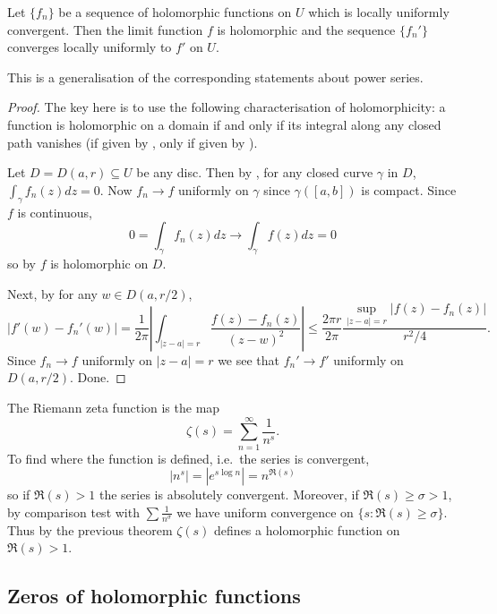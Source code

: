 \documentclass[a4paper]{article}
\begin{document}
\begin{theorem}
  Let \(\{f_n\}\) be a sequence of holomorphic functions on \(U\) which is locally uniformly convergent. Then the limit function \(f\) is holomorphic and the sequence \(\{f_n'\}\) converges locally uniformly to \(f'\) on \(U\).
\end{theorem}

This is a generalisation of the corresponding statements about power series.

\begin{proof}
  The key here is to use the following characterisation of holomorphicity: a function is holomorphic on a domain if and only if its integral along any closed path vanishes (if given by , only if given by ).
  
  Let \(D = D(a, r) \subseteq U\) be any disc. Then by , for any closed curve \(\gamma\) in \(D\), \(\int_\gamma f_n(z) dz = 0\). Now \(f_n \to f\) uniformly on \(\gamma\) since \(\gamma([a, b])\) is compact. Since \(f\) is continuous,
  \[
    0 = \int_\gamma f_n(z) dz \to \int_\gamma f(z) dz = 0
  \]
  so by  \(f\) is holomorphic on \(D\).

  Next, by  for any \(w \in D(a, r/2)\),
  \[
    |f'(w) - f_n'(w)|
    = \frac{1}{2\pi} \left| \int_{|z - a| = r} \frac{f(z) - f_n(z)}{(z - w)^2} \right|
    \leq \frac{2\pi r}{2\pi} \frac{\sup_{|z - a| = r} |f(z) - f_n(z)|}{r^2/4}.
  \]
  Since \(f_n \to f\) uniformly on \(|z - a| = r\) we see that \(f_n' \to f'\) uniformly on \(D(a, r/2)\). Done.
\end{proof}

\begin{eg}
  The Riemann zeta function is the map
  \[
    \zeta(s) = \sum_{n = 1}^\infty \frac{1}{n^s}.
  \]
  To find where the function is defined, i.e.\ the series is convergent,
  \[
    |n^s| = |e^{s \log n}| = n^{\Re(s)}
  \]
  so if \(\Re(s) > 1\) the series is absolutely convergent. Moreover, if \(\Re(s) \geq \sigma > 1\), by comparison test with \(\sum \frac{1}{n^\sigma}\) we have uniform convergence on \(\{s: \Re(s) \geq \sigma\}\). Thus by the previous theorem \(\zeta(s)\) defines a holomorphic function on \(\Re(s) > 1\).
\end{eg}

\subsection{Zeros of holomorphic functions}
\end{document}
